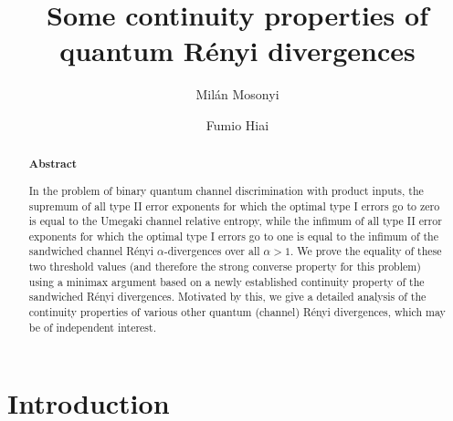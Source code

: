 \documentclass[unsortedaddress,superscriptaddress,pra,notitlepage]{revtex4}
\begin{document}
\pagestyle{plain}

\title{Some continuity properties of quantum R\'enyi divergences}


\author{Mil\'an Mosonyi}



\author{Fumio Hiai}



\begin{abstract}
\centerline{\textbf{Abstract}}
\vspace{.3cm}

In the problem of binary quantum channel discrimination with product inputs, the supremum of all type II error exponents
for which the optimal type I errors go to zero is equal to the Umegaki channel relative entropy, while the
infimum of all type II error exponents
for which the optimal type I errors go to one is equal to the infimum of the sandwiched channel 
R\'enyi $\alpha$-divergences over all $\alpha>1$. 
We prove the equality of these two threshold values 
(and therefore the strong converse property for this problem)
using a minimax argument
based on a newly established continuity property of the sandwiched R\'enyi divergences.
Motivated by this, we give a detailed analysis of 
the continuity properties of various other quantum (channel) R\'enyi divergences, which may be of independent interest. 
\end{abstract}

\maketitle


\section{Introduction}
\end{document}
